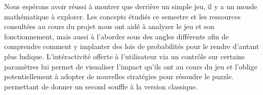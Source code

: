 \documentclass[a4paper, 12pt]{report}
\begin{document}
\tabto{1cm}Nous espérons avoir réussi à montrer que derrière un simple jeu, il y a un monde
mathématique à explorer. Les concepts étudiés ce semestre et les ressources consultées au
cours du projet nous ont aidé à analyser le jeu et son fonctionnement, mais aussi à l'aborder
sous des angles différents afin de comprendre comment y implanter des lois de probabilités
pour le rendre d'autant plus ludique. L'intéractivité offerte à l'utilisateur via un contrôle
sur certains paramètres lui permet de visualiser l'impact qu'ils ont au cours du jeu et l'oblige 
potentiellement à adopter de nouvelles stratégies pour résoudre le puzzle. permettant de donner un
second souffle à la version classique.
\end{document}
